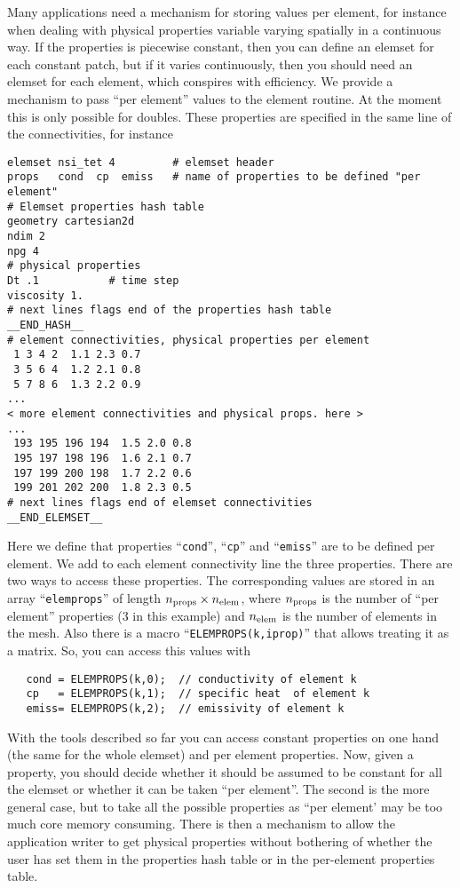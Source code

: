 %
Many applications need a mechanism for storing values per element, for
instance when dealing with physical properties variable varying
spatially in a continuous way. If the properties is piecewise constant,
then you can define an elemset for each constant patch, but if it
varies continuously, then you should need an elemset for each element,
which conspires with efficiency. We provide a mechanism to pass ``per
element'' values to the element routine. At the moment this is only
possible for doubles. These properties are specified in the same line
of the connectivities, for instance
%
\begin{verbatim}
elemset nsi_tet 4         # elemset header 
props   cond  cp  emiss   # name of properties to be defined "per element"
# Elemset properties hash table
geometry cartesian2d
ndim 2
npg 4
# physical properties
Dt .1           # time step
viscosity 1.
# next lines flags end of the properties hash table
__END_HASH__
# element connectivities, physical properties per element
 1 3 4 2  1.1 2.3 0.7
 3 5 6 4  1.2 2.1 0.8
 5 7 8 6  1.3 2.2 0.9
...
< more element connectivities and physical props. here >
...
 193 195 196 194  1.5 2.0 0.8
 195 197 198 196  1.6 2.1 0.7
 197 199 200 198  1.7 2.2 0.6
 199 201 202 200  1.8 2.3 0.5
# next lines flags end of elemset connectivities
__END_ELEMSET__
\end{verbatim}
%
Here we define that properties ``\verb+cond+'', ``\verb+cp+'' and
``\verb+emiss+'' are to be defined per element. We add to each element
connectivity line the three properties. There are two ways to access
these properties. The corresponding values are stored in an array
``\verb+elemprops+'' of
length ${n_\mathrm{props}}\times{n_\mathrm{elem}}$, where ${n_\mathrm{props}}$ is the number of ``per
element'' properties (3 in this example) and ${n_\mathrm{elem}}$ is the number of
elements in the mesh. Also there is a macro
``\verb+ELEMPROPS(k,iprop)+'' that allows treating it as a matrix. 
So, you can access this values with 
%
\begin{verbatim}
   cond = ELEMPROPS(k,0);  // conductivity of element k
   cp   = ELEMPROPS(k,1);  // specific heat  of element k
   emiss= ELEMPROPS(k,2);  // emissivity of element k
\end{verbatim}


With the tools described so far you can access constant properties on
one hand (the same for the whole elemset) and per element
properties. Now, given a property, you should decide whether it should
be assumed to be constant for all the elemset or whether it can be
taken ``per element''. The second is the more general case, but to
take all the possible properties as ``per element' may be too much
core memory consuming. There is then a mechanism to allow the
application writer to get physical properties without bothering of
whether the user has set them in the properties hash table or in the
per-element properties table. 

